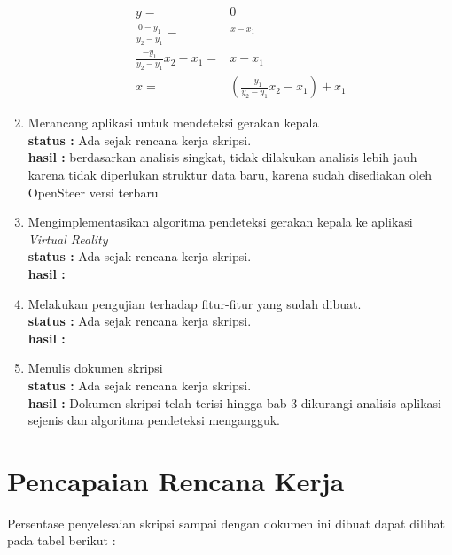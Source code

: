 \documentclass[a4paper,twoside]{article}
\begin{document}
\begin{enumerate}
\begin{equation}
	\begin{split}
		y = & 0\\		
		\frac{0-y_1}{y_2-y_1} = & \frac{x-x_1}{} \\
		\frac{-y_1}{y_2-y_1} x_2-x_1 = & x-x_1 \\
		x = & (\frac{-y_1}{y_2-y_1} x_2-x_1) +x_1
	\end{split}
\label{eq:aljabar-pencarian-titik-potong}
\end{equation}




		\item Merancang aplikasi untuk mendeteksi gerakan kepala\\
		{\bf status :} Ada sejak rencana kerja skripsi. \\
		{\bf hasil :} berdasarkan analisis singkat, tidak dilakukan analisis lebih jauh karena tidak diperlukan struktur data baru, karena sudah disediakan oleh OpenSteer versi terbaru

		\item Mengimplementasikan algoritma pendeteksi gerakan kepala ke aplikasi \textit{Virtual Reality}\\
		{\bf status :} Ada sejak rencana kerja skripsi.\\
		{\bf hasil :}

		\item Melakukan pengujian terhadap fitur-fitur yang sudah dibuat.\\
		{\bf status :} Ada sejak rencana kerja skripsi.\\
		{\bf hasil :}

		\item Menulis dokumen skripsi\\
		{\bf status :} Ada sejak rencana kerja skripsi.\\
		{\bf hasil :} 
		Dokumen skripsi telah terisi hingga bab 3 dikurangi analisis aplikasi sejenis dan algoritma pendeteksi mengangguk.
	\end{enumerate}




\section{Pencapaian Rencana Kerja}
Persentase penyelesaian skripsi sampai dengan dokumen ini dibuat dapat dilihat pada tabel berikut :
\end{document}
